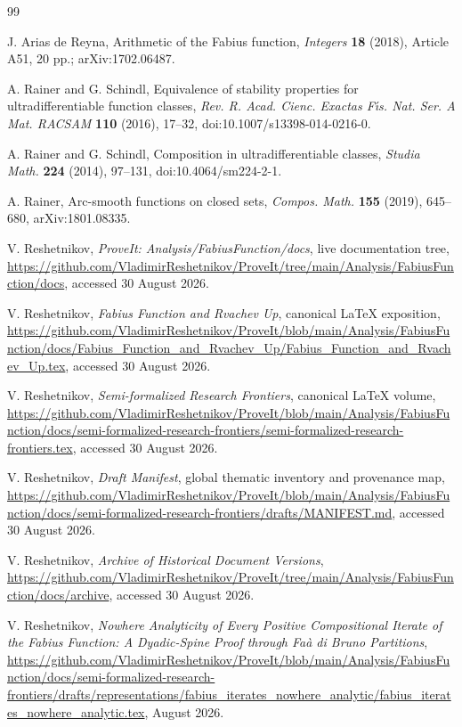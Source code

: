 \documentclass[11pt,a4paper]{article}
\theoremstyle{definition}
\theoremstyle{remark}
\begin{document}
\begingroup
\small
\begin{thebibliography}{99}

J. Arias de Reyna,
\newblock Arithmetic of the Fabius function,
\newblock \emph{Integers} \textbf{18} (2018), Article A51, 20 pp.;
\newblock arXiv:1702.06487.

A. Rainer and G. Schindl,
\newblock Equivalence of stability properties for ultradifferentiable function
classes,
\newblock \emph{Rev. R. Acad. Cienc. Exactas F\'{\i}s. Nat. Ser. A Mat. RACSAM}
\textbf{110} (2016), 17--32,
\newblock doi:10.1007/s13398-014-0216-0.

A. Rainer and G. Schindl,
\newblock Composition in ultradifferentiable classes,
\newblock \emph{Studia Math.} \textbf{224} (2014), 97--131,
\newblock doi:10.4064/sm224-2-1.

A. Rainer,
\newblock Arc-smooth functions on closed sets,
\newblock \emph{Compos. Math.} \textbf{155} (2019), 645--680,
\newblock arXiv:1801.08335.

V. Reshetnikov,
\newblock \emph{ProveIt: Analysis/FabiusFunction/docs}, live documentation tree,
\newblock \url{https://github.com/VladimirReshetnikov/ProveIt/tree/main/Analysis/FabiusFunction/docs},
\newblock accessed 30 August 2026.

V. Reshetnikov,
\newblock \emph{Fabius Function and Rvachev Up}, canonical LaTeX exposition,
\newblock \url{https://github.com/VladimirReshetnikov/ProveIt/blob/main/Analysis/FabiusFunction/docs/Fabius_Function_and_Rvachev_Up/Fabius_Function_and_Rvachev_Up.tex},
\newblock accessed 30 August 2026.

V. Reshetnikov,
\newblock \emph{Semi-formalized Research Frontiers}, canonical LaTeX volume,
\newblock \url{https://github.com/VladimirReshetnikov/ProveIt/blob/main/Analysis/FabiusFunction/docs/semi-formalized-research-frontiers/semi-formalized-research-frontiers.tex},
\newblock accessed 30 August 2026.

V. Reshetnikov,
\newblock \emph{Draft Manifest}, global thematic inventory and provenance map,
\newblock \url{https://github.com/VladimirReshetnikov/ProveIt/blob/main/Analysis/FabiusFunction/docs/semi-formalized-research-frontiers/drafts/MANIFEST.md},
\newblock accessed 30 August 2026.

V. Reshetnikov,
\newblock \emph{Archive of Historical Document Versions},
\newblock \url{https://github.com/VladimirReshetnikov/ProveIt/tree/main/Analysis/FabiusFunction/docs/archive},
\newblock accessed 30 August 2026.

V. Reshetnikov,
\newblock \emph{Nowhere Analyticity of Every Positive Compositional Iterate of the
Fabius Function: A Dyadic-Spine Proof through Fa\`a di Bruno Partitions},
\newblock \url{https://github.com/VladimirReshetnikov/ProveIt/blob/main/Analysis/FabiusFunction/docs/semi-formalized-research-frontiers/drafts/representations/fabius_iterates_nowhere_analytic/fabius_iterates_nowhere_analytic.tex},
 August 2026.

\end{thebibliography}
\endgroup
\end{document}
